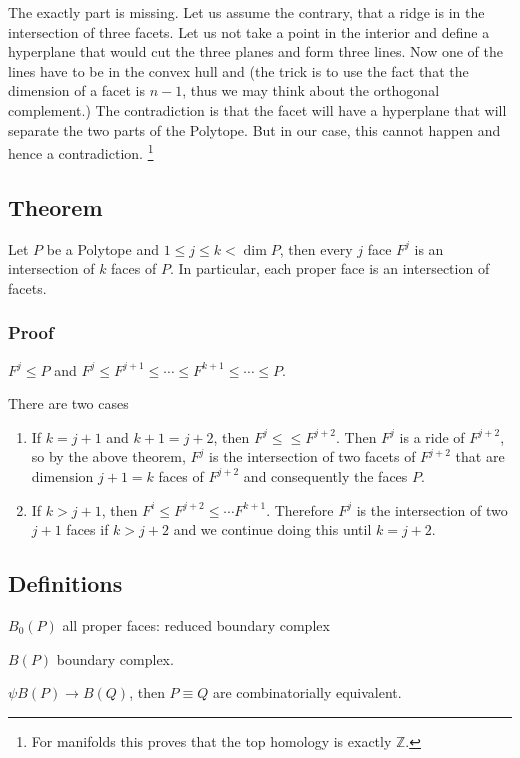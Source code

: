 \documentclass[11pt]{article}
\def\Z{\mathbb{Z}}
\begin{document}
The exactly part is missing. Let us assume the contrary, that a ridge is in
the intersection of three facets. Let us not take a point in the interior
and define a hyperplane that would cut the three planes and form three
lines. Now one of the lines have to be in the convex hull and (the trick is
to use the fact that the dimension of a facet is \(n-1\), thus we may think
about the orthogonal complement.) The contradiction is that the facet will
have a hyperplane that will separate the two parts of the Polytope. But in
our case, this cannot happen and hence a contradiction. \footnote{For manifolds this proves that the top homology is exactly \(\Z\).}
\subsection{Theorem}
\label{sec:org058ddc9}
Let \(P\) be a Polytope and \(1 \le j \le k < \dim P\), then every \(j\) face \(F^j\)
is an intersection of \(k\) faces of \(P\). In particular, each proper face is an
intersection of facets.
\subsubsection{Proof}
\label{sec:org8a9faf0}
\(F^j \le P\) and \(F^j \le F^{j+1} \le \cdots \le F^{k+1} \le \cdots \le P\).

There are two cases

\begin{enumerate}
\item If \(k = j+1\) and \(k +1 = j+2\), then \(F^j \le \le F^{j+2}\). Then \(F^j\) is
a ride of \(F^{j+2}\), so by the above theorem, \(F^j\) is the intersection
of two facets of \(F^{j+2}\) that are dimension \(j+1 = k\) faces of
\(F^{j+2}\) and consequently the faces \(P\).
\item If \(k > j +1\), then \(F^i \le F^{j+2} \le \cdots F^{k+1}\). Therefore \(F^j\)
is the intersection of two \(j+1\) faces if \(k > j+2\) and we continue doing
this until \(k = j+2\).
\end{enumerate}
\subsection{Definitions}
\label{sec:orgd4d477e}
\(B_0(P)\) all proper faces: reduced boundary complex

\(B(P)\) boundary complex.

\(\psi B(P) \rightarrow B(Q)\), then \(P \equiv Q\) are combinatorially
equivalent.
\end{document}
